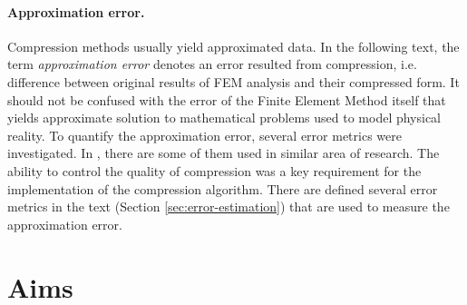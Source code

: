 \paragraph{Approximation error.} Compression methods usually yield approximated data. In the following text, the term \textit{approximation error} denotes an error resulted from compression, i.e. difference between original results of FEM analysis and their compressed form. It should not be confused with the error of the Finite Element Method itself that yields approximate solution to mathematical problems used to model physical reality. To quantify the approximation error, several error metrics were investigated. In \cite{SairaBanu2015}, there are some of them used in similar area of research. The ability to control the quality of compression was a key requirement for the implementation of the compression algorithm. There are defined several error metrics in the text (Section \ref{sec:error-estimation}) that are used to measure the approximation error.




\section{Aims} %

